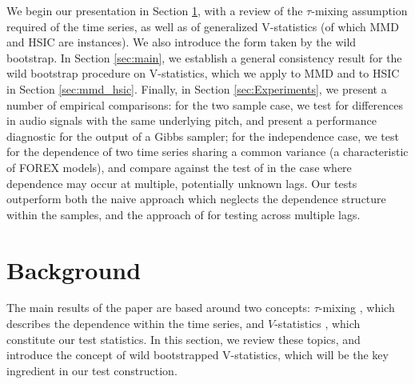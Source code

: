 \documentclass{article} %
\begin{document}

We begin our presentation in Section \ref{sec:background}, with a review of the $\tau$-mixing assumption required of the time series, as well as of  generalized V-statistics (of which MMD and HSIC are instances). We also introduce the form taken by the wild bootstrap. In Section \ref{sec:main}, we establish a general consistency result for the wild bootstrap procedure on V-statistics, which we apply to MMD and to HSIC in Section \ref{sec:mmd_hsic}. Finally, in Section \ref{sec:Experiments}, we present a number of empirical comparisons: for the two sample case, we test for differences in audio signals with the same underlying pitch, and present a performance diagnostic for the output of a Gibbs sampler; for the independence case, we test for the dependence of two time series sharing a common variance (a characteristic of FOREX models), and compare against the test of \cite{besserve_statistical_2013} in the case where dependence may occur at multiple, potentially unknown lags. Our tests outperform both the naive approach which neglects the dependence structure within the samples, and the approach of \cite{besserve_statistical_2013} for testing across multiple lags.

\vspace{-2mm}
\section{Background}\label{sec:background}
\vspace{-2mm}
The main results of the paper are based around two concepts: $\tau$-mixing \cite{dedecker2007weak}, which describes the dependence within the time series, and  $V$-statistics \cite{serfling80}, which constitute our test statistics. In this section, we review these topics, and introduce the concept of wild bootstrapped V-statistics, which will be the key ingredient in our test construction.
\end{document}
